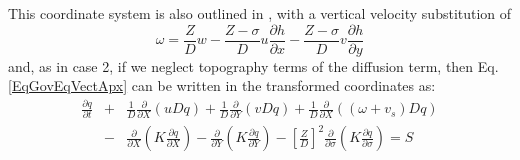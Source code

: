 This coordinate system is also outlined in \cite{Slordal02}, with a vertical velocity
substitution of
\begin{equation}\label{v_sub1}
\omega = \frac{Z}{D}w - \frac{Z-\sigma}{D}u \frac{\partial h}{\partial x} - \frac{Z-\sigma}{D} v \frac{\partial h}{\partial y}
\end{equation}
and, as in case 2, if we neglect topography terms of the diffusion term, then Eq. \ref{EqGovEqVectApx} can be
written in the transformed coordinates as:
\begin{eqnarray}
\frac{\partial q}{\partial t} 
&+& \frac{1}{D}\frac{\partial }{\partial X} \left(uDq\right)
+ \frac{1}{D}\frac{\partial }{\partial Y} \left(vDq\right)
+ \frac{1}{D}\frac{\partial }{\partial X} \left(\left( \omega + v_s \right)Dq\right) \\
&-& \frac{\partial }{\partial X} \left( K \frac{\partial q}{\partial X} \right) 
- \frac{\partial }{\partial Y} \left( K \frac{\partial q}{\partial Y} \right) 
- \left[\frac{Z}{D}\right]^2 \frac{\partial}{\partial \sigma} \left( K \frac{\partial q}{\partial \sigma} \right)
= S
\end{eqnarray}



